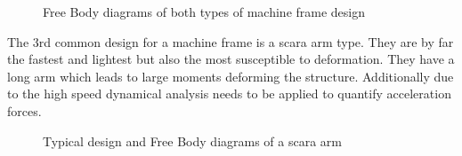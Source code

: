 \documentclass[11pt, a4paper]{article}
\numberwithin{equation}{section}
\numberwithin{figure}{section}
\begin{document}
\begin{figure}[h]
  \centering
  \qquad
  \caption{Free Body diagrams of both types of machine frame design}
\end{figure}
The 3rd common design for a machine frame is a scara arm type. They are by far the fastest and lightest but also the most susceptible to deformation. They have a long arm which leads to large moments deforming the structure. Additionally due to the high speed dynamical analysis needs to be applied to quantify acceleration forces.
\begin{figure}[h]
  \centering
  \qquad
  \caption{Typical design and Free Body diagrams of a scara arm}
\end{figure}
\end{document}
